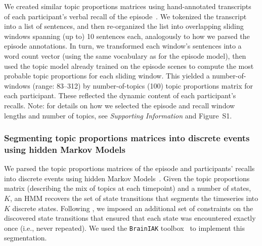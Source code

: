 \documentclass[10pt]{article}
\newcommand{\topicopt}{S1}
\begin{document}
We created similar topic proportions matrices using hand-annotated transcripts of each participant's verbal recall of the episode~\citep[annotated by][]{ChenEtal17}.  We tokenized the transcript into a list of sentences, and then re-organized the list into overlapping sliding windows spanning (up to) 10 sentences each, analogously to how we parsed the episode annotations.  In turn, we transformed each window's sentences into a word count vector (using the same vocabulary as for the episode model), then used the topic model already trained on the episode scenes to compute the most probable topic proportions for each sliding window.  This yielded a number-of-windows (range: 83--312) by number-of-topics (100) topic proportions matrix for each participant.  These reflected the dynamic content of each participant's recalls.  Note: for details on how we selected the episode and recall window lengths and number of topics, see \textit{Supporting Information} and Figure~\topicopt.


\subsubsection*{Segmenting topic proportions matrices into discrete events using hidden Markov Models}
We parsed the topic proportions matrices of the episode and participants' recalls into discrete events using hidden Markov Models~\citep[HMMs;][]{Rabi89}.  Given the topic proportions matrix (describing the mix of topics at each timepoint) and a number of states, $K$, an HMM recovers the set of state transitions that segments the timeseries into $K$ discrete states.  Following \cite{BaldEtal17}, we imposed an additional set of constraints on the discovered state transitions that ensured that each state was encountered exactly once (i.e., never repeated).  We used the \texttt{BrainIAK} toolbox~\citep{Brainiak} to implement this segmentation.
\end{document}
